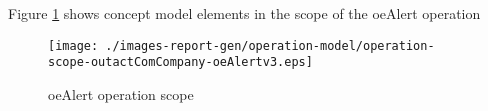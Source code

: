 Figure \ref{fig:lu.uni.lassy.icrash.spec.messir.reference-OM-scopeView-operation-scope-outactComCompany-oeAlertv3}
shows concept model elements in the scope of the oeAlert operation

\begin{figure}[htbp]
\begin{center}

\texttt{[image: ./images-report-gen/operation-model/operation-scope-outactComCompany-oeAlertv3.eps]}
\end{center}
\caption[lu.uni.lassy.icrash.spec.messir.reference Operation Scope: operation-scope-outactComCompany-oeAlertv3]{oeAlert operation scope
}
\label{fig:lu.uni.lassy.icrash.spec.messir.reference-OM-scopeView-operation-scope-outactComCompany-oeAlertv3}
\end{figure}
\vspace{0.5cm}

